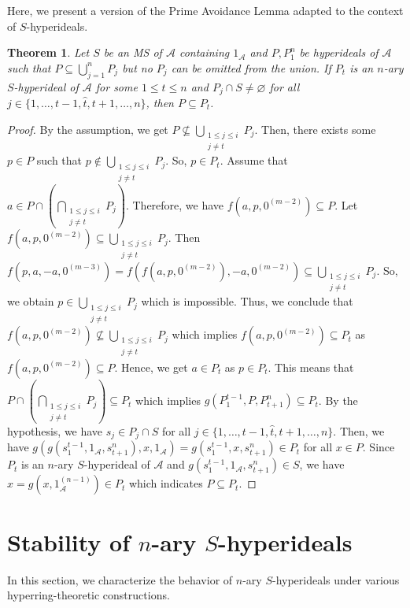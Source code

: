 \documentclass[preprint,review,10pt]{amsart}
\newtheorem{theorem}{Theorem}[section]
\theoremstyle{definition}
\theoremstyle{remark}
\numberwithin{equation}{section}
\begin{document}
  Here, we present a version of the Prime Avoidance Lemma adapted to the context of $S$-hyperideals.
\begin{theorem} \label{avoidance}
Let $S$ be an MS of  $\mathscr{A}$ containing $1_{\mathscr{A}}$ and $P,P_1^n$ be hyperideals of $\mathscr{A}$ such that $P \subseteq \bigcup_{j=1}^n P_j$ but no $P_j$ can be omitted from the union. If $P_t$ is an $n$-ary $S$-hyperideal of $\mathscr{A}$ for some $1 \leq t \leq n$ and $P_j \cap S \neq \varnothing$ for all $j \in \{1,\dots,t\!-\!\!1,\hat{t},t\!+\!1,\ldots,n\}$, then $P \subseteq P_t$. 
\end{theorem}
\begin{proof}
By the assumption, we get $P \nsubseteq \bigcup_{\substack{1 \leq j \leq i \\ j \neq t}} P_j$. Then, there exists some $p \in P$ such that $p \notin \bigcup_{\substack{1 \leq j \leq i \\ j \neq t}} P_j$. So, $p \in P_t$. Assume that $a \in P \cap (\bigcap_{\substack{1 \leq j \leq i \\ j \neq t}} P_j)$. Therefore, we have $f(a,p,0^{(m-2)}) \subseteq P$. Let  $f(a,p,0^{(m-2)}) \subseteq \bigcup_{\substack{1 \leq j \leq i \\ j \neq t}} P_j$. Then  $f(p,a,-a,0^{(m-3)})=f(f(a,p,0^{(m-2)}),-a,0^{(m-2)}) \subseteq \bigcup_{\substack{1 \leq j \leq i \\ j \neq t}} P_j$. So,  we obtain $p \in  \bigcup_{\substack{1 \leq j \leq i \\ j \neq t}} P_j$ which is impossible.  Thus, we conclude that $f(a,p,0^{(m-2)}) \nsubseteq \bigcup_{\substack{1 \leq j \leq i \\ j \neq t}} P_j$ which implies $f(a,p,0^{(m-2)}) \subseteq P_t$ as $f(a,p,0^{(m-2)}) \subseteq P$. Hence, we get $a \in P_t$  as $p \in P_t$. This means that $P \cap (\bigcap_{\substack{1 \leq j \leq i \\ j \neq t}} P_j) \subseteq P_t$ which implies $g(P_1^{t-1},P,P_{t+1}^n) \subseteq P_t$. By the hypothesis, we have $s_j \in P_j \cap S$ for all  $j \in \{1,\dots,t\!-\!\!1,\hat{t},t\!+\!1,\ldots,n\}$. Then, we have $g(g(s_1^{t-1},1_{\mathscr{A}},s_{t+1}^n),x,1_{\mathscr{A}})=g(s_1^{t-1},x,s_{t+1}^n) \in P_t$ for all $x \in P$. Since $P_t$ is an $n$-ary $S$-hyperideal of $\mathscr{A}$ and $ g(s_1^{t-1},1_{\mathscr{A}},s_{t+1}^n)\in S$, we have $x=g(x,1_{\mathscr{A}}^{(n-1)}) \in P_t$ which indicates $P \subseteq P_t$.
\end{proof}
\section{Stability of $n$-ary $S$-hyperideals}
In this section, we characterize the behavior of $n$-ary $S$-hyperideals under various hyperring-theoretic constructions.
\end{document}
